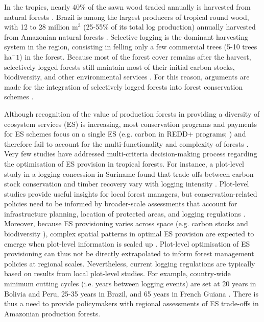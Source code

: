 \documentclass{article}
\begin{document}
In the tropics, nearly 40\% of the sawn wood traded annually is harvested from natural forests \cite{Payn2015}. Brazil is among the largest producers of tropical round wood, with 12 to 28 million m$^3$ (25-55\% of its total log production) annually harvested from Amazonian natural forests \cite{Santos2013,FAOstat2019}. Selective logging is the dominant harvesting system in the region, consisting in felling only a few commercial trees (5-10 trees ha$^-1$) in the forest. Because most of the forest cover remains after the harvest, selectively logged forests still maintain most of their initial carbon stocks, biodiversity, and other environmental services \cite{Putz2012}. For this reason, arguments are made for the integration of selectively logged forests into forest conservation schemes \cite{Edwards2014a}.  

Although recognition of the value of production forests in providing a diversity of ecosystem services (ES) is increasing, most conservation programs and payments for ES schemes focus on a single ES (e.g. carbon in REDD+ programs; \cite{Laing2016}) and therefore fail to account for the multi-functionality and complexity of forests \cite{VanderPlas2017}. Very few studies have addressed multi-criteria decision-making process regarding the optimisation of ES provision in tropical forests. For instance, a plot-level study in a logging concession in Suriname found that trade-offs between carbon stock conservation and timber recovery vary with logging intensity \cite{Roopsind2018}. Plot-level studies provide useful insights for local forest managers, but conservation-related policies need to be informed by broader-scale assessments  that account for infrastructure planning, location of protected areas, and logging regulations \cite{Hein2006b}. Moreover, because ES provisioning varies across space (e.g. carbon stocks \cite{Avitabile2016} and biodiversity \cite{Jenkins2013}), complex spatial patterns in optimal ES provision are expected to emerge when plot-level information is scaled up \cite{Gibson2000}. Plot-level optimisation of ES provisioning can thus not be directly extrapolated to inform forest management policies at regional scales. Nevertheless, current logging regulations are typically based on results from local plot-level studies. For example, country-wide minimum cutting cycles (i.e. years between logging events) are set at 20 years in Bolivia and Peru, 25-35 years in Brazil, and 65 years in French Guiana \cite{Blaser2011}. There is thus a need to provide policymakers with regional assessments of ES trade-offs in Amazonian production forests.  
\end{document}
